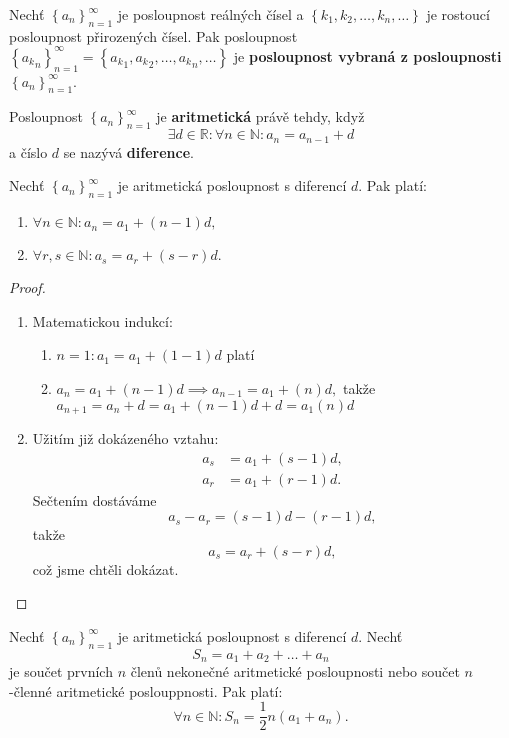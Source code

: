\begin{definition}
Nechť $\left \{ a_n \right \}_{n=1}^\infty $ je posloupnost reálných čísel a
$\left \{ k_1,k_2,\dots,k_n,\dots \right \} $ je rostoucí posloupnost přirozených čísel.
Pak posloupnost $\left \{{a_k}_n \right \}_{n=1}^\infty = \left \{ {a_k}_1, {a_k}_2, \dots, {a_k}_n,\dots \right \}  $
je \textbf{posloupnost vybraná z posloupnosti} $\left \{ a_n \right \}_{n=1}^\infty $.
\end{definition}

\begin{definition}
Posloupnost $\left \{ a_n \right \}_{n=1}^\infty $ je \textbf{aritmetická} právě
tehdy, když
$$\exists d \in \mathbb R: \forall n \in \mathbb N: a_n=a_{n-1}+d$$
a číslo $d$ se nazývá \textbf{diference}.
\end{definition}

\begin{veta}
    Nechť $\left \{ a_n \right \}_{n=1}^\infty $ je aritmetická posloupnost s diferencí
    $d$. Pak platí:
    \begin{enumerate}[$i.$]
    \item $\forall n\in \mathbb N: a_n = a_1 + (n-1)d,$
   	\item $\forall r,s \in \mathbb N: a_s = a_r + (s-r)d.$
    \end{enumerate}
\end{veta}

\begin{proof}
\begin{enumerate}[$i.$]
\item Matematickou indukcí:
\begin{enumerate}[1.]
\item $n=1: a_1 = a_1+(1-1)d$ platí
\item $a_n = a_1+(n-1)d \implies a_{n-1}=a_1+(n)d,$ takže $a_{n+1}=a_n+d=a_1+(n-1)d+d=a_1(n)d$
\end{enumerate}
\item Užitím již dokázeného vztahu:
\begin{align*}
    a_s &= a_1 + (s-1)d,\\
    a_r &= a_1 + (r-1)d.
\end{align*}
Sečtením dostáváme
$$a_s-a_r = (s-1)d-(r-1)d,$$
takže
$$a_s=a_r+(s-r)d,$$
což jsme chtěli dokázat.\qedhere
\end{enumerate}
\end{proof}

\begin{veta}
Nechť $\left \{ a_n \right \}_{n=1}^\infty $ je aritmetická posloupnost s diferencí
$d$. Nechť
$$S_n=a_1+a_2+\dots+a_n$$
je součet prvních $n$ členů nekonečné aritmetické posloupnosti nebo součet
$n$-členné aritmetické poslouppnosti. Pak platí:
$$\forall n \in \mathbb N:S_n = \frac{1}{2}n(a_1+a_n).$$
\end{veta}


